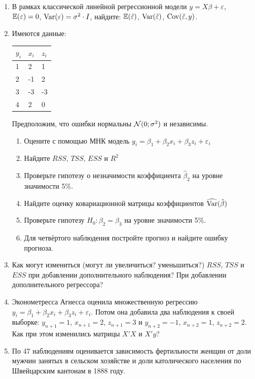 \documentclass[12pt, a4paper]{article}\usepackage[]{graphicx}\usepackage[]{color}
\begin{document}
\begin{enumerate}

\item В рамках классической линейной регрессионной модели $y=X\beta+ \varepsilon$, $\mathbb{E}(\varepsilon)=0$, $\operatorname{Var}(\varepsilon)=\sigma^2 \cdot I$, найдите: $\mathbb{E}(\hat\varepsilon)$, $\operatorname{Var}(\hat\varepsilon)$, $\operatorname{Cov}(\hat\varepsilon, y)$.

\item Имеются данные:

\begin{tabular}{lll}
\toprule
$y_i$ & $x_i$ & $z_i$ \\
\midrule
1 & 2 & 1 \\
2 & -1 & 2 \\
3 & -3 & -3 \\
4 & 2 & 0 \\
\bottomrule
\end{tabular}

Предположим, что ошибки нормальны $\mathcal{N}(0;\sigma^2)$ и независимы.

\begin{enumerate}
\item Оцените с помощью МНК модель $y_i=\beta_1 + \beta_2 x_i + \beta_3 z_i + \varepsilon_i$
\item Найдите $RSS$, $TSS$, $ESS$ и $R^2$
\item Проверьте гипотезу о незначимости коэффициента $\hat\beta_2$ на уровне значимости 5\%.
\item Найдите оценку ковариационной матрицы коэффициентов $\widehat{\operatorname{Var}}(\hat\beta)$
\item Проверьте гипотезу $H_0: \beta_2 = \beta_3$ на уровне значимости 5\%.
\item Для четвёртого наблюдения постройте прогноз и найдите ошибку прогноза.
\end{enumerate}

\item Как могут измениться (могут ли увеличиться? уменьшиться?) $RSS$, $TSS$ и $ESS$ при добавлении дополнительного наблюдения? При добавлении дополнительного регрессора?

\item Эконометресса Агнесса оценила множественную регрессию $y_i = \beta_1 + \beta_2 x_i + \beta_3 z_i + \varepsilon_i$. Потом она добавила два наблюдения к своей выборке: $y_{n+1}=1$, $x_{n+1}=2$, $z_{n+1}=3$ и $y_{n+2}=-1$, $x_{n+2}=1$, $z_{n+2}=2$. Как при этом изменились матрицы $X'X$ и $X'y$?


\item По 47 наблюдениям оценивается зависимость фертильности женщин от доли мужчин занятых в сельском хозяйстве и доли католического населения по Швейцарским кантонам в 1888 году.


\end{enumerate}
\end{document}
